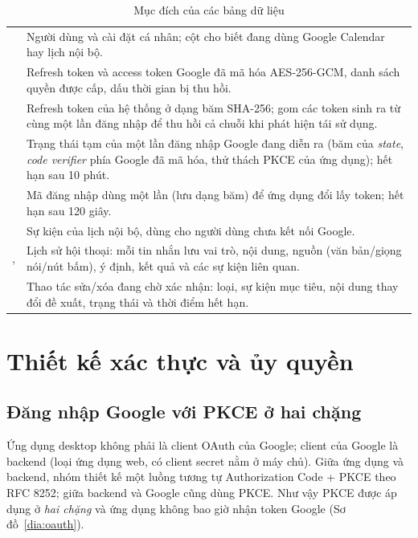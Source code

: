 \begin{table}[!htbp]
\caption{Mục đích của các bảng dữ liệu}\label{tab:db}
\bang
\begin{tabularx}{\textwidth}{|L{3.3cm}|Y|}\hline
{} & \\\hline
{} & Người dùng và cài đặt cá nhân; cột  cho biết đang dùng Google Calendar hay lịch nội bộ.\\\hline
{} & Refresh token và access token Google đã mã hóa AES-256-GCM, danh sách quyền được cấp, dấu thời gian bị thu hồi.\\\hline
{} & Refresh token của hệ thống ở dạng băm SHA-256;  gom các token sinh ra từ cùng một lần đăng nhập để thu hồi cả chuỗi khi phát hiện tái sử dụng.\\\hline
{} & Trạng thái tạm của một lần đăng nhập Google đang diễn ra (băm của \textit{state}, \textit{code verifier} phía Google đã mã hóa, thử thách PKCE của ứng dụng); hết hạn sau 10 phút.\\\hline
{} & Mã đăng nhập dùng một lần (lưu dạng băm) để ứng dụng đổi lấy token; hết hạn sau 120 giây.\\\hline
{} & Sự kiện của lịch nội bộ, dùng cho người dùng chưa kết nối Google.\\\hline
{},  & Lịch sử hội thoại: mỗi tin nhắn lưu vai trò, nội dung, nguồn (văn bản/giọng nói/nút bấm), ý định, kết quả và các sự kiện liên quan.\\\hline
{} & Thao tác sửa/xóa đang chờ xác nhận: loại, sự kiện mục tiêu, nội dung thay đổi đề xuất, trạng thái và thời điểm hết hạn.\\\hline
\end{tabularx}
\end{table}

\section{Thiết kế xác thực và ủy quyền}
\subsection{Đăng nhập Google với PKCE ở hai chặng}
Ứng dụng desktop không phải là client OAuth của Google; client của Google là backend (loại ứng dụng web, có client secret nằm ở máy chủ). Giữa ứng dụng và backend, nhóm thiết kế một luồng tương tự Authorization Code + PKCE theo RFC 8252; giữa backend và Google cũng dùng PKCE. Như vậy PKCE được áp dụng ở \textit{hai chặng} và ứng dụng không bao giờ nhận token Google (Sơ đồ~\ref{dia:oauth}).

